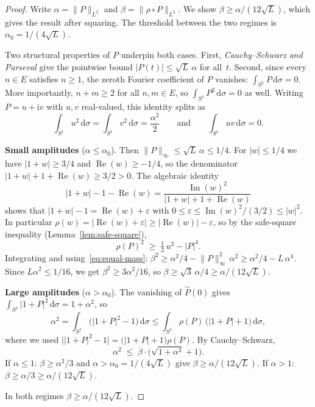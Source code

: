 \documentclass[11pt]{amsart}
\theoremstyle{definition}
\theoremstyle{remark}
\begin{document}
\begin{proof}
Write $\alpha = \lVert P \rVert_{L^2}$ and $\beta = \lVert \rho \circ P \rVert_{L^2}$.
We show $\beta \ge \alpha/(12\sqrt{L})$, which gives the result after
squaring.  The threshold between the two regimes is
$\alpha_0 = 1/(4\sqrt{L})$.

Two structural properties of $P$ underpin both cases.  First,
\emph{Cauchy--Schwarz and Parseval} give the pointwise bound
$\lvert P(t) \rvert \le \sqrt{L}\, \alpha$ for all~$t$.
Second, since every $n \in E$ satisfies $n \ge 1$, the zeroth Fourier
coefficient of $P$ vanishes:
$\int_{S^1} P\,\mathrm{d}\sigma = 0$.
More importantly, $n + m \ge 2$ for all $n, m \in E$, so
$\int_{S^1} P^2\,\mathrm{d}\sigma = 0$ as well.  Writing $P = u + \mathrm{i} v$ with
$u, v$ real-valued, this identity splits as
\begin{equation}\label{eq:equal-mass}
\int_{S^1} u^2\,\mathrm{d}\sigma
= \int_{S^1} v^2\,\mathrm{d}\sigma
= \frac{\alpha^2}{2}
\qquad\text{and}\qquad
\int_{S^1} uv\,\mathrm{d}\sigma = 0.
\end{equation}

\medskip
\noindent
\textbf{Small amplitudes} ($\alpha \le \alpha_0$).
Then $\lVert P \rVert_\infty \le \sqrt{L}\,\alpha \le 1/4$.  For $\lvert w \rvert \le 1/4$
we have $\lvert 1+w \rvert \ge 3/4$ and $\operatorname{Re}(w) \ge -1/4$, so the denominator
$\lvert 1+w \rvert + 1 + \operatorname{Re}(w) \ge 3/2 > 0$.  The algebraic identity
\[
\lvert 1+w \rvert - 1 - \operatorname{Re}(w)
= \frac{\operatorname{Im}(w)^2}{\lvert 1+w \rvert + 1 + \operatorname{Re}(w)}
\]
shows that $\lvert 1+w \rvert - 1 = \operatorname{Re}(w) + \varepsilon$ with
$0 \le \varepsilon \le \operatorname{Im}(w)^2/(3/2) \le \lvert w \rvert^2$.  In particular
$\rho(w) = \bigl\lvert \operatorname{Re}(w) + \varepsilon\bigr\rvert \ge
\lvert \operatorname{Re}(w) \rvert - \varepsilon$, so by the safe-square inequality
(Lemma~\ref{lem:safe-square}),
\[
\rho(P)^2 \;\ge\; \tfrac{1}{2}\, u^2 - \lvert P \rvert^4.
\]
Integrating and using~\eqref{eq:equal-mass}:
$\beta^2 \ge \alpha^2/4 - \lVert P \rVert_\infty^2\, \alpha^2 \ge \alpha^2/4 - L\,\alpha^4$.
Since $L\alpha^2 \le 1/16$, we get $\beta^2 \ge 3\alpha^2/16$, so
$\beta \ge \sqrt{3}\,\alpha/4 \ge \alpha/(12\sqrt{L})$.

\medskip
\noindent
\textbf{Large amplitudes} ($\alpha > \alpha_0$).
The vanishing of $\hat P(0)$ gives
$\int_{S^1}\lvert 1+P \rvert^2\,\mathrm{d}\sigma = 1 + \alpha^2$, so
\[
\alpha^2
= \int_{S^1}\bigl(\lvert 1+P \rvert^2 - 1\bigr)\,\mathrm{d}\sigma
\le \int_{S^1} \rho(P)\,\bigl(\lvert 1+P \rvert + 1\bigr)\,\mathrm{d}\sigma,
\]
where we used $\bigl\lvert \lvert 1+P \rvert^2 - 1\bigr\rvert
= \bigl(\lvert 1+P \rvert + 1\bigr)\rho(P)$.  By Cauchy--Schwarz,
\[
\alpha^2 \;\le\; \beta \cdot \bigl(\sqrt{1+\alpha^2} + 1\bigr).
\]
If $\alpha \le 1$: $\beta \ge \alpha^2/3$ and $\alpha > \alpha_0 = 1/(4\sqrt{L})$ give
$\beta \ge \alpha/(12\sqrt{L})$.
If $\alpha > 1$: $\beta \ge \alpha/3 \ge \alpha/(12\sqrt{L})$.

\medskip
In both regimes $\beta \ge \alpha/(12\sqrt{L})$.
\end{proof}
\end{document}
